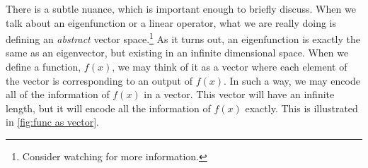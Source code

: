 There is a subtle nuance, which is important enough to briefly discuss. When we talk about an eigenfunction or a linear operator, what we are really doing is defining an \textit{abstract} vector space.\footnote{Consider watching \cite{3blue1brown_abstract_2016} for more information.} As it turns out, an eigenfunction is exactly the same as an eigenvector, but existing in an infinite dimensional space. When we define a function, $f(x)$, we may think of it as a vector where each element of the vector is corresponding to an output of $f(x)$. In such a way, we may encode all of the information of $f(x)$ in a vector. This vector will have an infinite length, but it will encode all the information of $f(x)$ exactly. This is illustrated in \autoref{fig:func as vector}.

\begin{figure}[ht]
    \centering



\begin{tikzpicture}[x=0.75pt,y=0.75pt,yscale=-1,xscale=1]


\end{tikzpicture}
\end{figure}
